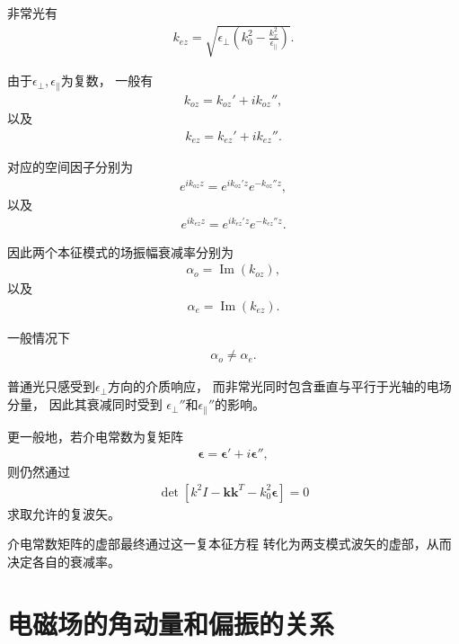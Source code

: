 \documentclass{article}
\begin{document}
非常光有
\begin{align}
    \boxed{
    k_{ez}
    =
    \sqrt{
    \epsilon_\perp
    \left(
    k_0^2
    -
    \frac{k_x^2}{\epsilon_\parallel}
    \right)
    }
    }.
\end{align}

由于$\epsilon_\perp,\epsilon_\parallel$为复数，
一般有
\begin{align}
    k_{oz}
    =
    k_{oz}'
    +
    ik_{oz}'',
\end{align}
以及
\begin{align}
    k_{ez}
    =
    k_{ez}'
    +
    ik_{ez}''.
\end{align}

对应的空间因子分别为
\begin{align}
    e^{ik_{oz}z}
    =
    e^{ik_{oz}'z}
    e^{-k_{oz}''z},
\end{align}
以及
\begin{align}
    e^{ik_{ez}z}
    =
    e^{ik_{ez}'z}
    e^{-k_{ez}''z}.
\end{align}

因此两个本征模式的场振幅衰减率分别为
\begin{align}
    \boxed{
    \alpha_o
    =
    \operatorname{Im}(k_{oz})
    },
\end{align}
以及
\begin{align}
    \boxed{
    \alpha_e
    =
    \operatorname{Im}(k_{ez})
    }.
\end{align}

一般情况下
\begin{align}
    \boxed{
    \alpha_o\neq\alpha_e
    }.
\end{align}

普通光只感受到$\epsilon_\perp$方向的介质响应，
而非常光同时包含垂直与平行于光轴的电场分量，
因此其衰减同时受到
$\epsilon_\perp''$和$\epsilon_\parallel''$的影响。

更一般地，若介电常数为复矩阵
\begin{align}
    \boldsymbol{\epsilon}
    =
    \boldsymbol{\epsilon}'
    +
    i\boldsymbol{\epsilon}'',
\end{align}
则仍然通过
\begin{align}
    \boxed{
    \det
    \left[
    k^2I-\mathbf k\mathbf k^T
    -k_0^2\boldsymbol{\epsilon}
    \right]
    =0
    }
\end{align}
求取允许的复波矢。

介电常数矩阵的虚部最终通过这一复本征方程
转化为两支模式波矢的虚部，从而决定各自的衰减率。
\section{电磁场的角动量和偏振的关系}
\end{document}
